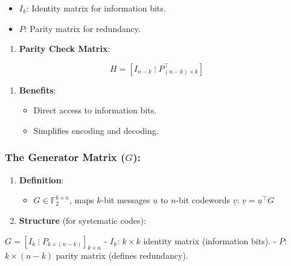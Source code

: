 \documentclass[11pt]{article}
\providecommand{\tightlist}{%
      \setlength{\itemsep}{0pt}\setlength{\parskip}{0pt}}
\begin{document}
\begin{itemize}
\tightlist
\item
  \(I_k\): Identity matrix for information bits.
\item
  \(P\): Parity matrix for redundancy.
\end{itemize}

\begin{enumerate}
\def\labelenumi{\arabic{enumi}.}
\setcounter{enumi}{2}
\tightlist
\item
  \textbf{Parity Check Matrix}:
\end{enumerate}

\[\boxed{H = [I_{n-k} \; \vdots \; P_{(n-k) \times k}^\top]}\]

\begin{enumerate}
\def\labelenumi{\arabic{enumi}.}
\setcounter{enumi}{3}
\tightlist
\item
  \textbf{Benefits}:

  \begin{itemize}
  \tightlist
  \item
    Direct access to information bits.
  \item
    Simplifies encoding and decoding.
  \end{itemize}
\end{enumerate}

    \subsubsection{\texorpdfstring{The Generator Matrix
(\(G\)):}{The Generator Matrix (G):}}\label{the-generator-matrix-g}

\begin{enumerate}
\def\labelenumi{\arabic{enumi}.}
\tightlist
\item
  \textbf{Definition}:

  \begin{itemize}
  \tightlist
  \item
    \(G \in \mathbb{F}_2^{k \times n}\), maps \(k\)-bit messages
    \(\underline{u}\) to \(n\)-bit codewords \(\underline{v}\):
    \(\underline{v} = \underline{u}^\top G\)
  \end{itemize}
\item
  \textbf{Structure} (for systematic codes):
\end{enumerate}

\(\boxed{G = [I_k \; \vdots \; P_{k \times (n-k)}]_{k \times n}}\) -
\(I_k\): \(k \times k\) identity matrix (information bits). - \(P\):
\(k \times (n-k)\) parity matrix (defines redundancy).
\end{document}
